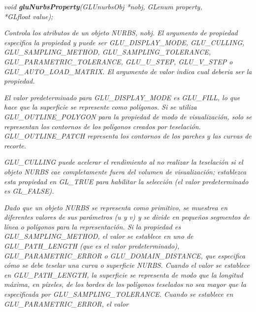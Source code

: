 \begin{description}
    \item \emph{void \textbf{gluNurbsProperty}(GLUnurbsObj *nobj, GLenum property,\\*GLfloat value);}
    \begin{description}
        \item \textit{
            Controla los atributos de un objeto NURBS,
            nobj. El argumento de propiedad especifica la propiedad
            y puede ser GLU\_DISPLAY\_MODE, GLU\_CULLING, GLU\_SAMPLING\_METHOD,
            GLU\_SAMPLING\_TOLERANCE, GLU\_PARAMETRIC\_TOLERANCE, GLU\_U\_STEP,
            GLU\_V\_STEP o GLU\_AUTO\_LOAD\_MATRIX. El argumento de valor indica
            cual deberia ser la propiedad.
        }
        \item \textit{
            El valor predeterminado para GLU\_DISPLAY\_MODE
            es GLU\_FILL, lo que hace que la superficie se represente
            como polígonos. Si se utiliza GLU\_OUTLINE\_POLYGON para la
            propiedad de modo de visualización, solo se representan los
            contornos de los polígonos creados por teselación.
            GLU\_OUTLINE\_PATCH representa los contornos de los parches
            y las curvas de recorte.
        }
        \item \textit{
            GLU\_CULLING puede acelerar el rendimiento al
            no realizar la teselación si el objeto NURBS cae completamente
            fuera del volumen de visualización; establezca esta propiedad
            en GL\_TRUE para habilitar la selección (el valor
            predeterminado es GL\_FALSE).
        }
        \item \textit{Dado que un objeto NURBS se representa como
            primitivo, se muestrea en diferentes valores de sus
            parámetros (u y v) y se divide en pequeños segmentos de
            línea o polígonos para la representación. Si la propiedad
            es GLU\_SAMPLING\_METHOD, el valor se establece en uno
            de GLU\_PATH\_LENGTH (que es el valor
            predeterminado), GLU\_PARAMETRIC\_ERROR o
            GLU\_DOMAIN\_DISTANCE, que
            especifica cómo se debe teselar una curva o superficie
            NURBS. Cuando el valor se establece en GLU\_PATH\_LENGTH,
            la superficie se representa de modo que la longitud máxima,
            en píxeles, de los bordes de los polígonos teselados no
            sea mayor que la especificada por GLU\_SAMPLING\_TOLERANCE.
            Cuando se establece en GLU\_PARAMETRIC\_ERROR, el valor
}
\end{description}
\end{description}
